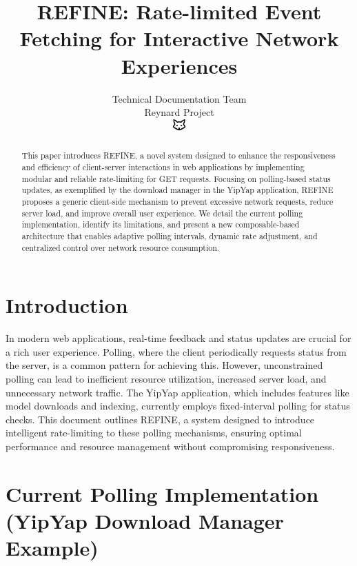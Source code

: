 \documentclass[10pt]{article}
\begin{document}
\title{REFINE: Rate-limited Event Fetching for Interactive Network Experiences}

\author{Technical Documentation Team\\
Reynard Project\\
\includegraphics[width=0.5cm]{../../shared-assets/favicon.pdf}}

\maketitle

\begin{abstract}
This paper introduces REFINE, a novel system designed to enhance the responsiveness and efficiency of client-server interactions in web applications by implementing modular and reliable rate-limiting for GET requests. Focusing on polling-based status updates, as exemplified by the download manager in the YipYap application, REFINE proposes a generic client-side mechanism to prevent excessive network requests, reduce server load, and improve overall user experience. We detail the current polling implementation, identify its limitations, and present a new composable-based architecture that enables adaptive polling intervals, dynamic rate adjustment, and centralized control over network resource consumption.
\end{abstract}

\section{Introduction}

In modern web applications, real-time feedback and status updates are crucial for a rich user experience. Polling, where the client periodically requests status from the server, is a common pattern for achieving this. However, unconstrained polling can lead to inefficient resource utilization, increased server load, and unnecessary network traffic. The YipYap application, which includes features like model downloads and indexing, currently employs fixed-interval polling for status checks. This document outlines REFINE, a system designed to introduce intelligent rate-limiting to these polling mechanisms, ensuring optimal performance and resource management without compromising responsiveness.

\section{Current Polling Implementation (YipYap Download Manager Example)}
\end{document}
